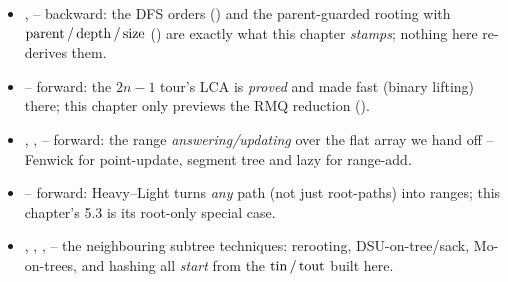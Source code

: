 
\begin{itemize}[nosep, leftmargin=1.4em]
  \item {},  -- backward: the DFS orders () and the
        parent-guarded rooting with $\operatorname{parent}/\operatorname{depth}/\operatorname{size}$ () are exactly
        what this chapter \emph{stamps}; nothing here re-derives them.
  \item {} -- forward: the $2n{-}1$ tour's LCA is \emph{proved} and made
        fast (binary lifting) there; this chapter only previews the RMQ reduction
        ().
  \item {}, ,  -- forward: the range \emph{answering/updating}
        over the flat array we hand off -- Fenwick for point-update, segment tree and lazy for
        range-add.
  \item {} -- forward: Heavy--Light turns \emph{any} path (not just root-paths) into
        ranges; this chapter's 5.3 is its root-only special case.
  \item {}, , ,  -- the neighbouring subtree
        techniques: rerooting, DSU-on-tree/sack, Mo-on-trees, and hashing all \emph{start} from
        the $\operatorname{tin}/\operatorname{tout}$ built here.
\end{itemize}

